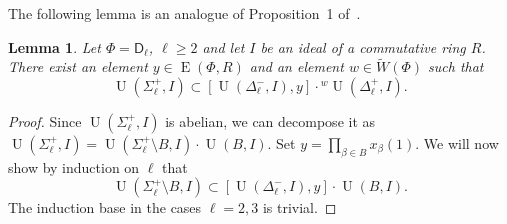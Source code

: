 \documentclass[11pt]{amsart}
\theoremstyle{plain}
\numberwithin{equation}{section}
\newtheorem{lemma}{Lemma}
\numberwithin{lemma}{section}
\theoremstyle{definition}
\theoremstyle{remark}
\DeclareMathOperator{\E}{E}
\DeclareMathOperator{\U}{U}
\newcommand{\rD}{\mathsf{D}}
\begin{document}
The following lemma is an analogue of Proposition~1 of~\cite{Nik07}.
\begin{lemma}\label{lemma:nikolov-type-dl}
Let $\Phi=\rD_\ell$, $\ell\geq 2$ and let $I$ be an ideal of a  commutative ring $R$.
There exist an element $y\in\E(\Phi, R)$ and an element $w\in\widetilde{W}(\Phi)$ such that
\[ \U(\Sigma_\ell^+, I)\subset[\U(\Delta_\ell^-, I), y]\cdot{}^w\!\U(\Delta_\ell^+, I). \]
\end{lemma}
\begin{proof}
Since $\U(\Sigma_\ell^+, I)$ is abelian, we can decompose it as $\U(\Sigma_\ell^+, I)=\U(\Sigma_\ell^+\setminus B, I) \cdot \U(B, I)$. 
Set $y=\prod_{\beta\in B}x_\beta(1)$. 
We will now show by induction on $\ell$ that 
\begin{equation}\label{eq:ind-stat} \U(\Sigma_\ell^+\setminus B, I)\subset[\U(\Delta_\ell^-, I), y]\cdot\U(B, I). \end{equation}
The induction base in the cases $\ell=2, 3$ is trivial.


\end{proof}
\end{document}
